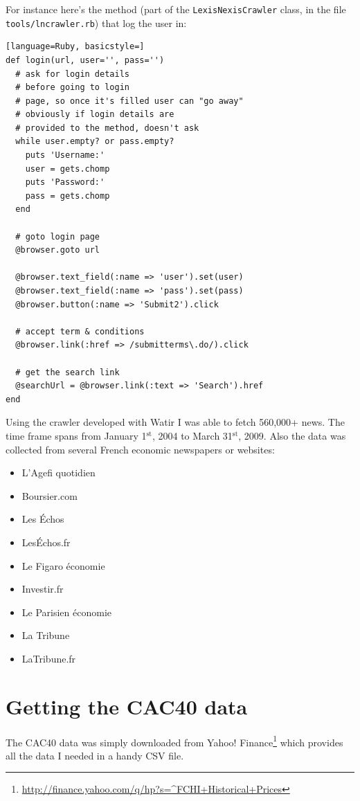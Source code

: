 \documentclass[12pt]{report}
\newcommand{\superscript}[1]{\ensuremath{^{\textrm{#1}}}}
\newcommand{\st}[0]{\superscript{st}}
\begin{document}
			For instance here's the method (part of the \lstinline!LexisNexisCrawler! class, in the file \lstinline!tools/lncrawler.rb!) that log the user in:
			
			\begin{lstlisting}[language=Ruby, basicstyle=]
def login(url, user='', pass='')
  # ask for login details
  # before going to login
  # page, so once it's filled user can "go away"
  # obviously if login details are 
  # provided to the method, doesn't ask
  while user.empty? or pass.empty?
    puts 'Username:'
    user = gets.chomp
    puts 'Password:'
    pass = gets.chomp
  end

  # goto login page
  @browser.goto url

  @browser.text_field(:name => 'user').set(user)
  @browser.text_field(:name => 'pass').set(pass)
  @browser.button(:name => 'Submit2').click
                                                                                                 
  # accept term & conditions
  @browser.link(:href => /submitterms\.do/).click

  # get the search link
  @searchUrl = @browser.link(:text => 'Search').href
end
			\end{lstlisting}
			
			Using the crawler developed with Watir I was able to fetch 560,000+ news. The time frame spans from January 1\st, 2004 to March 31\st, 2009. Also the data was collected from several French economic newspapers or websites:
			\begin{itemize}
				\item L'Agefi quotidien
				\item Boursier.com
				\item Les \'Echos
				\item Les\'Echos.fr
				\item Le Figaro économie
				\item Investir.fr
				\item Le Parisien économie
				\item La Tribune
				\item LaTribune.fr
			\end{itemize}
			
		\section{Getting the CAC40 data}
		
			The CAC40 data was simply downloaded from Yahoo! Finance\footnote{\url{http://finance.yahoo.com/q/hp?s=^FCHI+Historical+Prices}} which provides all the data I needed in a handy  CSV file.
		
\end{document}
